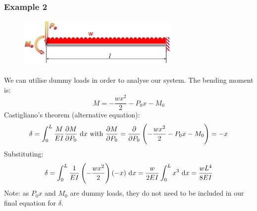 \documentclass[class=report, crop=false, 12pt,a4paper]{standalone}
\begin{document}
\subsubsection{Example 2}
\begin{figure}[H]
  \centering
  \includegraphics[width = 0.7\textwidth]{../img/diagram16.png}
  \caption{}
\end{figure}
We can utilise dummy loads in order to analyse our system. The bending moment is:
\begin{equation}
  M = - \frac{wx^2}{2} - P_0 x - M_0 
\end{equation}
Castigliano's theorem (alternative equation):
\begin{align}
  \delta = \int_0^L \frac{M}{EI} \frac{\partial M}{\partial P_0} \, \dif x \textrm{ with } \frac{\partial M}{\partial P_0} = \frac{\partial }{\partial P_0} \left(-\frac{wx^2}{2} - P_0 x - M_0\right) = -x
\end{align}
Substituting:
\begin{align}
  \delta = \int_0^L \frac{1}{EI} \left(-\frac{wx^2}{2}\right)\left(-x\right)\, \dif x = \frac{w}{2EI} \int_0^L x^3 \, \dif x = \frac{wL^4}{8EI}
\end{align}
Note: as $P_0 x$ and $M_0$ are dummy loads, they do not need to be included in our final equation for $\delta$.
\end{document}
